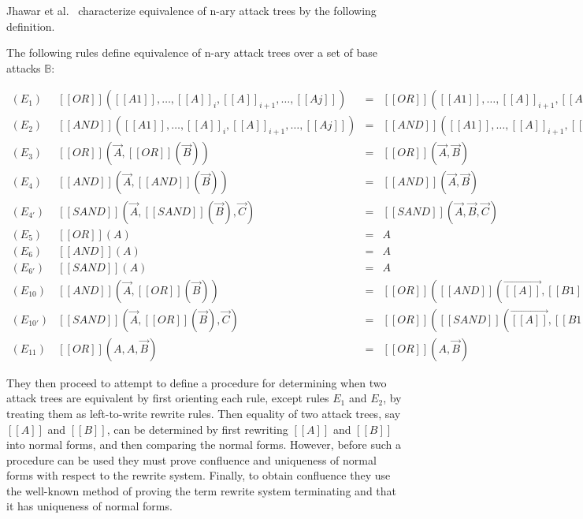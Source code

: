 Jhawar et al.~\cite{Jhawar:2015} characterize equivalence of n-ary
attack trees by the following definition.
\begin{definition}
  \label{def:jhawar-eq-atrees}
  The following rules define equivalence of n-ary attack trees over a
  set of base attacks $\mathbb{B}$:
  \begin{center}
    \begin{math}
      \begin{array}{llcl}
        (E_1) & [[OR]]([[A1]], \ldots, [[A]]_i,[[A]]_{i+1},\ldots,[[Aj]])  & = & [[OR]]([[A1]], \ldots, [[A]]_{i+1},[[A]]_i,\ldots,[[Aj]])\\
        (E_2) & [[AND]]([[A1]], \ldots, [[A]]_i,[[A]]_{i+1},\ldots,[[Aj]]) & = & [[AND]]([[A1]], \ldots, [[A]]_{i+1},[[A]]_i,\ldots,[[Aj]])\\
        (E_3) & [[OR]](\overrightarrow{A},[[OR]](\overrightarrow{B})) & = & [[OR]](\overrightarrow{A},\overrightarrow{B})\\
        (E_4) & [[AND]](\overrightarrow{A},[[AND]](\overrightarrow{B})) & = & [[AND]](\overrightarrow{A},\overrightarrow{B})\\
        (E_{4'}) & [[SAND]](\overrightarrow{A},[[SAND]](\overrightarrow{B}),\overrightarrow{C}) & = & [[SAND]](\overrightarrow{A},\overrightarrow{B},\overrightarrow{C})\\
        (E_5) & [[OR]](A) & = & A\\
        (E_6) & [[AND]](A) & = & A\\
        (E_{6'}) & [[SAND]](A) & = & A\\
        (E_{10}) & [[AND]](\overrightarrow{A},[[OR]](\overrightarrow{B})) & = & [[OR]]([[AND]](\overrightarrow{[[A]]},[[B1]]),\ldots,[[AND]](\overrightarrow{[[A]]},[[Bi]]))\\
        (E_{10'}) & [[SAND]](\overrightarrow{A},[[OR]](\overrightarrow{B}),\overrightarrow{C}) & = & [[OR]]([[SAND]](\overrightarrow{[[A]]},[[B1]],\overrightarrow{C}),\ldots,[[SAND]](\overrightarrow{[[A]]},[[Bi]],\overrightarrow{C}))\\
        (E_{11}) & [[OR]](A,A,\overrightarrow{B}) & = & [[OR]](A,\overrightarrow{B})
      \end{array}
    \end{math}
  \end{center}
\end{definition}
They then proceed to attempt to define a procedure for determining
when two attack trees are equivalent by first orienting each rule,
except rules $E_1$ and $E_2$, by treating them as left-to-write
rewrite rules.  Then equality of two attack trees, say $[[A]]$ and
$[[B]]$, can be determined by first rewriting $[[A]]$ and $[[B]]$ into
normal forms, and then comparing the normal forms.  However, before
such a procedure can be used they must prove confluence and uniqueness
of normal forms with respect to the rewrite system.  Finally, to
obtain confluence they use the well-known method of proving the term
rewrite system terminating and that it has uniqueness of normal forms.

